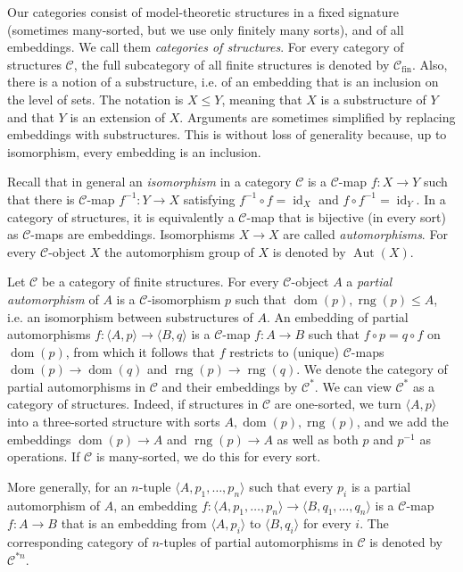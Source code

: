 \documentclass[oneside,notitlepage,12pt]{article}
\theoremstyle{definition}
\theoremstyle{remark}
\newcommand \seq [1]{\langle #1 \rangle}
\newcommand \maps {\colon} %
\newcommand \id [1]{{\operatorname{id}_{#1}}}
\newcommand \dom {\operatorname{dom}}
\newcommand \rng {\operatorname{rng}}
\newcommand \cmp {\circ} %
\newcommand \C {\mathscr{C}}
\newcommand \fin {{\operatorname{fin}}}
\newcommand \Aut {\operatorname{Aut}}
\begin{document}
Our categories consist of model-theoretic structures in a fixed signature (sometimes many-sorted, but we use only finitely many sorts), and of all embeddings.
We call them \emph{categories of structures}.
For every category of structures $\C$, the full subcategory of all finite structures is denoted by $\C_\fin$.
Also, there is a notion of a substructure, i.e. of an embedding that is an inclusion on the level of sets.
The notation is $X \leq Y$, meaning that $X$ is a substructure of $Y$ and that $Y$ is an extension of $X$.
Arguments are sometimes simplified by replacing embeddings with substructures. This is without loss of generality because, up to isomorphism, every embedding is an inclusion.

Recall that in general an {\it isomorphism} in a category $\C$ is a $\C$-map $f\maps X \to Y$ such that there is $\C$-map $f^{-1}\maps Y \to X$ satisfying $f^{-1} \cmp f = \id{X}$ and $f \cmp f^{-1} = \id{Y}$.
In a category of structures, it is equivalently a $\C$-map that is bijective (in every sort) as $\C$-maps are embeddings.
Isomorphisms $X \to X$ are called {\it automorphisms}.
For every $\C$-object $X$ the automorphism group of $X$ is denoted by $\Aut(X)$.



\medskip

Let $\C$ be a category of finite structures.
For every $\C$-object $A$ a \emph{partial automorphism} of $A$ is a $\C$-isomorphism $p$ such that $\dom(p), \rng(p) \leq A$, i.e. an isomorphism between substructures of $A$.
An embedding of partial automorphisms $f\maps \seq{A,p} \to \seq{B,q}$ is a $\C$-map $f\maps A \to B$ such that $f \cmp p = q \cmp f$ on $\dom(p)$, from which it follows that $f$ restricts to (unique) $\C$-maps $\dom(p) \to \dom(q)$ and $\rng(p) \to \rng(q)$.
We denote the category of partial automorphisms in $\C$ and their embeddings by $\C^*$.
We can view $\C^*$ as a category of structures. Indeed, if structures in $\C$ are one-sorted, we turn $\seq{A,p}$ into a three-sorted structure with sorts $A,\dom(p),\rng(p)$, and we add the embeddings  $\dom(p)\to A$ and $\rng(p) \to A$ as well as both $p$ and $p^{-1}$ as operations. If $\C$ is many-sorted, we do this for every sort.

More generally, for an $n$-tuple   $\seq{A, p_1, \ldots, p_n}$ such that every $p_i$ is a partial automorphism of $A$,  an embedding $f\maps \seq{A, p_1, \ldots, p_n} \to \seq{B, q_1, \ldots, q_n}$ is a $\C$-map $f\maps A \to B$ that is an embedding  from $\seq{A,p_i}$ to $ \seq{B,q_i}$ for every $i$.
The corresponding category of $n$-tuples of partial automorphisms in $\C$ is denoted by $\C^{*n}$.
\end{document}
